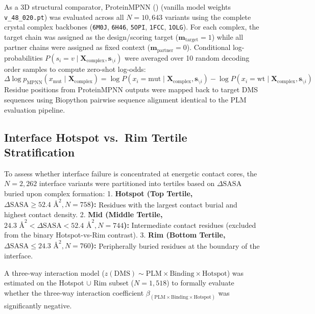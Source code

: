 \documentclass[
  11pt,
  us-letterpaper,
  DIV=11,
  numbers=noendperiod]{scrartcl}
\begin{document}
As a 3D structural comparator, ProteinMPNN
() (vanilla model
weights \texttt{v\_48\_020.pt}) was evaluated across all \(N = 10,643\)
variants using the complete crystal complex backbones (\texttt{6M0J},
\texttt{6H46}, \texttt{5OPI}, \texttt{1FCC}, \texttt{1OLG}). For each
complex, the target chain was assigned as the design/scoring target
(\(\mathbf{m}_{\text{target}} = 1\)) while all partner chains were
assigned as fixed context (\(\mathbf{m}_{\text{partner}} = 0\)).
Conditional log-probabilities
\(P(s_i = v \mid \mathbf{X}_{\text{complex}}, \mathbf{s}_{\setminus i})\)
were averaged over 10 random decoding order samples to compute zero-shot
log-odds:
\[\Delta \log p_{\text{MPNN}}(x_{\text{mut}} \mid \mathbf{X}_{\text{complex}}) = \log P(x_i = \text{mut} \mid \mathbf{X}_{\text{complex}}, \mathbf{s}_{\setminus i}) - \log P(x_i = \text{wt} \mid \mathbf{X}_{\text{complex}}, \mathbf{s}_{\setminus i})\]
Residue positions from ProteinMPNN outputs were mapped back to target
DMS sequences using Biopython pairwise sequence alignment identical to
the PLM evaluation pipeline.

\subsection{Interface Hotspot vs.~Rim Tertile
Stratification}\label{interface-hotspot-vs.-rim-tertile-stratification}

To assess whether interface failure is concentrated at energetic contact
cores, the \(N = 2,262\) interface variants were partitioned into
tertiles based on \(\Delta\text{SASA}\) buried upon complex formation:
1. \textbf{Hotspot (Top Tertile,
\(\Delta\text{SASA} \ge 52.4\text{ \AA}^2, N = 758\)):} Residues with
the largest contact burial and highest contact density. 2. \textbf{Mid
(Middle Tertile,
\(24.3\text{ \AA}^2 < \Delta\text{SASA} < 52.4\text{ \AA}^2, N = 744\)):}
Intermediate contact residues (excluded from the binary Hotspot-vs-Rim
contrast). 3. \textbf{Rim (Bottom Tertile,
\(\Delta\text{SASA} \le 24.3\text{ \AA}^2, N = 760\)):} Peripherally
buried residues at the boundary of the interface.

A three-way interaction model
(\(z(\text{DMS}) \sim \text{PLM} \times \text{Binding} \times \text{Hotspot}\))
was estimated on the Hotspot \(\cup\) Rim subset (\(N = 1,518\)) to
formally evaluate whether the three-way interaction coefficient
\(\beta_{(\text{PLM} \times \text{Binding} \times \text{Hotspot})}\) was
significantly negative.
\end{document}
